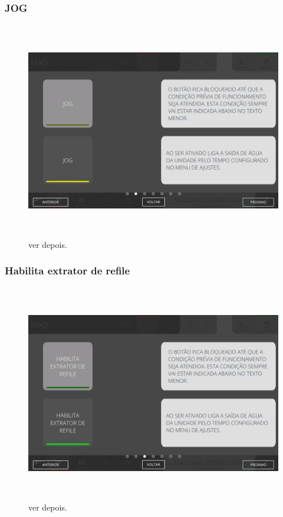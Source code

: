 \newpage
\thispagestyle{fancy}
\vspace*{\fill}
\subsubsection{\small{JOG}}
\begin{figure}[h]
  \centering
  \includegraphics[width=576px,height=360px]{src/images/07-fold/commands/e-2.png}
  \caption{ver depois.}
   \label{}
\end{figure}
\vspace*{\fill}

\newpage
\thispagestyle{fancy}
\vspace*{\fill}
\subsubsection{\small{Habilita extrator de refile}}
\begin{figure}[h]
  \centering
  \includegraphics[width=576px,height=360px]{src/images/07-fold/commands/e-3.png}
  \caption{ver depois.}
   \label{}
\end{figure}
\vspace*{\fill}

